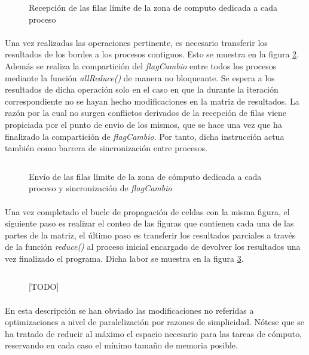 \documentclass[10pt, a4paper,spanish]{article}
\begin{document}
		\begin{figure}[h]
			\centering
			\inputminted{c}{./code/op3.c}
			\caption{Recepción de las filas límite de la zona de computo dedicada a cada proceso}
			\label{code:op3}
		\end{figure}

		\paragraph{}
		Una vez realizadas las operaciones pertinente, es necesario transferir los resultados de los bordes a los procesos contiguos. Esto se muestra en la figura \ref{code:op4}. Además se realiza la compartición del \emph{flagCambio} entre todos los procesos mediante la función \emph{allReduce()} de manera no bloqueante. Se espera a los resultados de dicha operación solo en el caso en que la durante la iteración correspondiente no se hayan hecho modificaciones en la matriz de resultados. La razón por la cual no surgen conflictos derivados de la recepción de filas viene propiciada por el punto de envio de los mismos, que se hace una vez que ha finalizado la compartición de \emph{flagCambio}. Por tanto, dicha instrucción actua también como barrera de sincronización entre procesos.

		\begin{figure}[h]
			\centering
			\inputminted{c}{./code/op4.c}
			\caption{Envío de las filas límite de la zona de cómputo dedicada a cada proceso y sincronización de \emph{flagCambio}}
			\label{code:op4}
		\end{figure}

		\paragraph{}
		Una vez completado el bucle de propagación de celdas con la misma figura, el siguiente paso es realizar el conteo de las figuras que contienen cada una de las partes de la matriz, el último paso es transferir los resultados parciales a través de la función \emph{reduce()} al proceso inicial encargado de devolver los resultados una vez finalizado el programa. Dicha labor se muestra en la figura \ref{code:op5}.

		\begin{figure}[h]
			\centering
			\inputminted{c}{./code/op5.c}
			\caption{[TODO]}
			\label{code:op5}
		\end{figure}

		\paragraph{}
		En esta descripción se han obviado las modificaciones no referidas a optimizaciones a nivel de paralelización por razones de simplicidad. Nótese que se ha tratado de reducir al máximo el espacio necesario para las tareas de cómputo, reservando en cada caso el mínimo tamaño de memoria posible.
\end{document}
